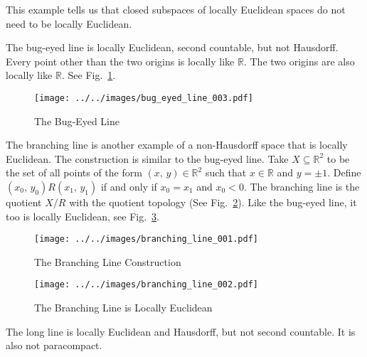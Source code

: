 \documentclass{article}
\theoremstyle{plain}
\theoremstyle{normal}
\newenvironment{example}{%
    \pushQED{\qed}\renewcommand{\qedsymbol}{$\blacksquare$}\examplex%
}{%
    \popQED\endexamplex%
}
\begin{document}
        This example tells us that closed subspaces of locally Euclidean spaces
        do not need to be locally Euclidean.
        \begin{example}
            The bug-eyed line is locally Euclidean, second countable, but not
            Hausdorff. Every point other than the two origins is locally like
            $\mathbb{R}$. The two origins are also locally like $\mathbb{R}$.
            See Fig.~\ref{fig:bug_eyed_line}.
        \end{example}
        \begin{figure}
            \centering
            \texttt{[image: ../../images/bug\_eyed\_line\_003.pdf]}
            \caption{The Bug-Eyed Line}
            \label{fig:bug_eyed_line}
        \end{figure}
        \begin{example}
            The branching line is another example of a non-Hausdorff space that
            is locally Euclidean. The construction is similar to the bug-eyed
            line. Take $X\subseteq\mathbb{R}^{2}$ to be the set of all points
            of the form $(x,\,y)\in\mathbb{R}^{2}$ such that $x\in\mathbb{R}$
            and $y=\pm{1}$. Define $(x_{0},\,y_{0})R(x_{1},\,y_{1})$ if and
            only if $x_{0}=x_{1}$ and $x_{0}<0$. The branching line is the
            quotient $X/R$ with the quotient topology
            (See Fig.~\ref{fig:branching_line_001}). Like the bug-eyed line,
            it too is locally Euclidean, see Fig.~\ref{fig:branching_line_002}.
        \end{example}
        \begin{figure}
            \centering
            \texttt{[image: ../../images/branching\_line\_001.pdf]}
            \caption{The Branching Line Construction}
            \label{fig:branching_line_001}
        \end{figure}
        \begin{figure}
            \centering
            \texttt{[image: ../../images/branching\_line\_002.pdf]}
            \caption{The Branching Line is Locally Euclidean}
            \label{fig:branching_line_002}
        \end{figure}
        \begin{example}
            The long line is locally Euclidean and Hausdorff, but not
            second countable. It is also not paracompact.
        \end{example}
\end{document}
